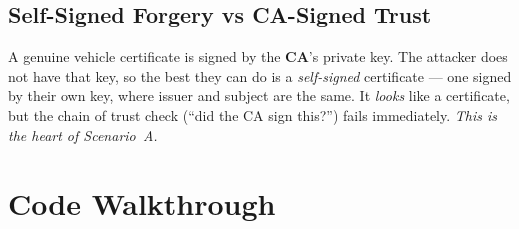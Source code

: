 \documentclass[11pt,a4paper]{report}
\begin{document}
\subsection{Self-Signed Forgery vs CA-Signed Trust}
A genuine vehicle certificate is signed by the \textbf{CA}'s private key. The
attacker does not have that key, so the best they can do is a \emph{self-signed}
certificate --- one signed by their own key, where issuer and subject are the
same. It \emph{looks} like a certificate, but the chain of trust check
(``did the CA sign this?'') fails immediately. \emph{This is the heart of
Scenario~A.}

\section{Code Walkthrough}
\end{document}
